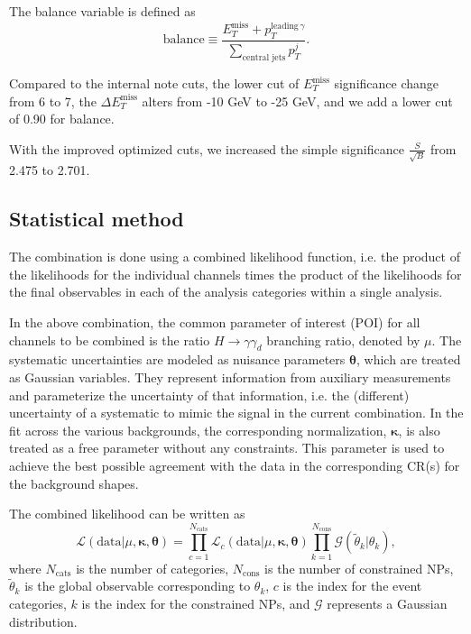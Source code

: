The balance variable is defined as
\begin{equation}
\text{balance}
\equiv
\frac{
E_T^{\text{miss}} + p_T^{\text{leading}\,\gamma}
}{
\displaystyle \sum_{\text{central jets}} p_T^{j}
}.
\end{equation}

Compared to the internal note cuts, the lower cut of $E_{T}^{\text{miss}}$ significance change from 6 to 7, the $\Delta E_{T}^{\text{miss}}$ alters from -10 GeV to -25 GeV, and we add a lower cut of 0.90 for balance. 

With the improved optimized cuts, we increased the simple significance $ \frac{S}{\sqrt{B}} $ from 2.475 to 2.701. 




\FloatBarrier
\subsection{Statistical method}
\label{sec:stat_method}
The combination is done using a combined likelihood function, i.e. the product of the likelihoods for the individual channels times the product of the likelihoods for the final observables in each of the analysis categories within a single analysis.

In the above combination, the common parameter of interest (POI) for all channels to be combined is the ratio $H \rightarrow \gamma \gamma_d$ branching ratio, denoted by $\mu$.
The systematic uncertainties are modeled as nuisance parameters $\bm{\theta}$, which are treated as Gaussian variables.
They represent information from auxiliary measurements and parameterize the uncertainty of that information, i.e. the (different) uncertainty of a systematic to mimic the signal in the current combination.
In the fit across the various backgrounds, the corresponding normalization, $\bm{\kappa}$, is also treated as a free parameter without any constraints. This parameter is used to achieve the best possible agreement with the data in the corresponding CR(s) for the background shapes.

The combined likelihood can be written as~\cite{Cranmer:1456844}
\begin{equation}
    \mathcal{L}\left(\mathrm{data}\vert\mu,\bm{\kappa},\bm{\theta}\right) = \prod_{c=1}^{N_\mathrm{cats}}\mathcal{L}_c\left(\mathrm{data}\vert\mu,\bm{\kappa},\bm{\theta}\right)\prod_{k=1}^{N_\mathrm{cons}}\mathcal{G}\left(\tilde{\theta}_k\vert\theta_k\right),
    \label{eq:combined_likelihood}
\end{equation}
where $N_\mathrm{cats}$ is the number of categories, $N_\mathrm{cons}$ is the number of constrained NPs, $\tilde{\theta}_k$ is the global observable corresponding to $\theta_k$, $c$ is the index for the event categories, $k$ is the index for the constrained NPs, and $\mathcal{G}$ represents a Gaussian distribution.

